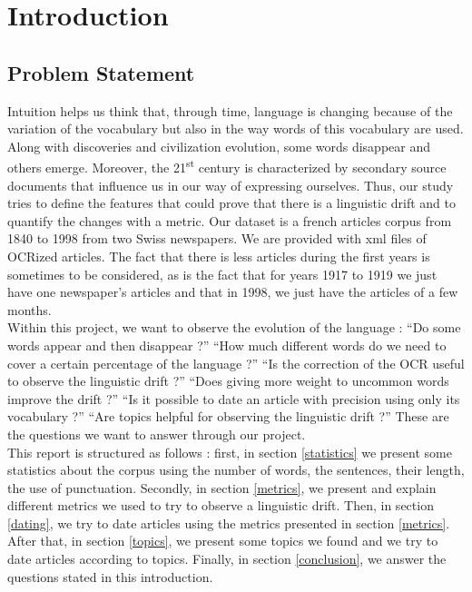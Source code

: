 \section{Introduction}

\subsection{Problem Statement}
Intuition helps us think that, through time, language is changing because of the variation of the vocabulary but also in the way words of this vocabulary are used.
Along with discoveries and civilization evolution, some words disappear and others emerge. Moreover, the 21\textsuperscript{st} century is characterized by secondary source documents that influence us in our way of expressing ourselves. Thus, our study tries to define the features that could prove that there is a linguistic drift and to quantify the changes with a metric.
Our dataset is a french articles corpus from 1840 to 1998 from two Swiss newspapers. We are provided with xml files of OCRized articles. The fact that there is less articles during the first years is sometimes to be considered, as is the fact that for years 1917 to 1919 we just have one newspaper's articles and that in 1998, we just have the articles of a few months.\\

Within this project, we want to observe the evolution of the language : \enquote{Do some words appear and then disappear ?} \enquote{How much different words do we need to cover a certain percentage of the language ?} \enquote{Is the correction of the OCR useful to observe the linguistic drift ?} \enquote{Does giving more weight to uncommon words improve the drift ?} \enquote{Is it possible to date an article with precision using only its vocabulary ?} \enquote{Are topics helpful for observing the linguistic drift ?} These are the questions we want to answer through our project.\\

This report is structured as follows : first, in section \ref{statistics} we present some statistics about the corpus using the number of words, the sentences, their length, the use of punctuation. Secondly, in section \ref{metrics}, we present and explain different metrics we used to try to observe a linguistic drift. Then, in section \ref{dating}, we try to date articles using the metrics presented in section \ref{metrics}. After that, in section \ref{topics}, we present some topics we found and we try to date articles according to topics. Finally, in section \ref{conclusion}, we answer the questions stated in this introduction.

